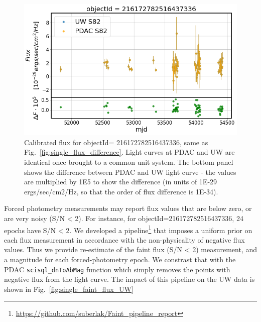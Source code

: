 \documentclass[DM,lsstdraft,toc,usenatbib]{lsstdoc}
\begin{document}
\begin{figure}
\includegraphics[width=\textwidth]{figs/Single_raw_LC_comparison}
\caption{Calibrated flux for objectId= 216172782516437336, same as Fig.~\ref{fig:single_flux_difference}. Light curves at PDAC and UW are identical once brought to a common unit system.  The bottom panel shows the difference between PDAC and UW light curve - the values are multiplied by 1E5 to show the difference (in units of 1E-29 ergs/sec/cm2/Hz, so that the order of flux difference is 1E-34). }
\label{fig:single_calib_flux}
\end{figure}



Forced photometry measurements may report flux values that are below zero, or are very noisy (S/N < 2). For instance, for objectId=216172782516437336, 24 epochs have S/N < 2.  We developed a pipeline\footnote{\url{https://github.com/suberlak/Faint_pipeline_report}} that imposes a uniform prior on each flux measurement in accordance with the non-physicality of negative flux values.  Thus we provide re-estimate of the faint flux (S/N < 2) measurement, and a magnitude for each forced-photometry epoch.  We constrast that with the PDAC \verb|scisql_dnToAbMag| function which simply removes the points with negative flux from the light curve. The impact of this pipeline on the UW data is shown in Fig.~\ref{fig:single_faint_flux_UW}
\end{document}
